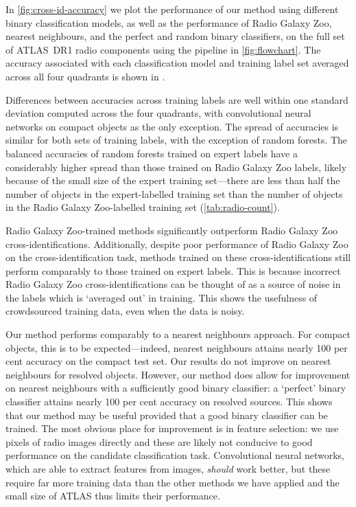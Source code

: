     In \autoref{fig:cross-id-accuracy} we plot the performance {of our
    method using different binary classification models}, as well as the
    performance of Radio Galaxy Zoo, nearest neighbours, and the perfect and
    random binary classifiers, on the full set of ATLAS~DR1 radio components
    using the pipeline in \autoref{fig:flowchart}. The accuracy
    {associated with each classification model} and training label set
    averaged across all four quadrants is shown in .

    Differences between accuracies across training labels are well within one
    standard deviation computed across the four quadrants, with convolutional
    neural networks on compact objects as the only exception. The spread of
    accuracies is similar for both sets of training labels, with the exception
    of random forests. The balanced accuracies of random forests trained on
    expert labels have a considerably higher spread than those trained on
    Radio Galaxy Zoo labels, likely because of the small size of the expert
    training set---there are less than half the number of objects in the
    expert-labelled training set than the number of objects in the Radio
    Galaxy Zoo-labelled training set (\autoref{tab:radio-count}).

    Radio Galaxy Zoo-trained methods significantly outperform Radio Galaxy Zoo
    cross-identifications. Additionally, despite poor performance of Radio
    Galaxy Zoo on the cross-identification task, methods trained on these
    cross-identifications still perform comparably to those trained on expert
    labels. This is because incorrect Radio Galaxy Zoo cross-identifications
    can be thought of as a source of noise in the labels which is `averaged out'
    in training. This shows the usefulness of crowdsourced training data, even
    when the data is noisy.

    Our method performs comparably to a nearest neighbours approach. For
    compact objects, this is to be expected---indeed, nearest neighbours
    attains nearly 100 per cent accuracy on the compact test set. Our results
    do not improve on nearest neighbours for resolved objects. However, our
    method does allow for improvement on nearest neighbours with a
    sufficiently good binary classifier: a `perfect' binary classifier attains
    nearly 100 per cent accuracy on resolved sources. This shows that our
    method may be useful provided that a good binary classifier can be
    trained. The most obvious place for improvement is in feature selection:
    we use pixels of radio images directly and these are likely not conducive
    to good performance on the candidate classification task. Convolutional
    neural networks, which are able to extract features from images,
    \emph{should} work better, but these require far more training data than
    the other methods we have applied and the small size of ATLAS thus limits their performance.

